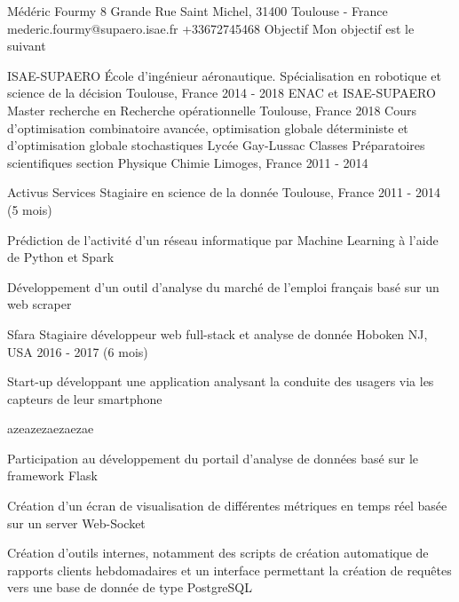 \documentclass[11pt, a4paper, final]{resume}
\begin{document}
	\header
		{Médéric}
		{Fourmy}
		{8 Grande Rue Saint Michel, 31400 Toulouse - France}
		{mederic.fourmy@supaero.isae.fr}
		{+33672745468}
		{Objectif}
		{Mon objectif est le suivant}


	\begin{cventries}
		\cventry
		{ISAE-SUPAERO}
		{École d'ingénieur aéronautique. Spécialisation en robotique et science de la décision}
		{Toulouse, France}
		{2014 - 2018}
		{}
		\cventry
		{ENAC et ISAE-SUPAERO}
		{Master recherche en Recherche opérationnelle}
		{Toulouse, France}
		{2018}
		{Cours d'optimisation combinatoire avancée, optimisation globale déterministe et d'optimisation globale stochastiques}
		\cventry
		{Lycée Gay-Lussac}
		{Classes Préparatoires scientifiques section Physique Chimie}
		{Limoges, France}
		{2011 - 2014}
		{}
	\end{cventries}

	\cvsection{Expérience professionnelle}
	\begin{cventries}
		\cventry
		{Activus Services}
		{Stagiaire en science de la donnée}
		{Toulouse, France}
		{2011 - 2014 (5 mois)}
		{
			\begin{cvitems}{}
				\item Prédiction de l'activité d'un réseau informatique par Machine Learning à l'aide de Python et Spark
				\item Développement d'un outil d'analyse du marché de l'emploi français basé sur un web scraper
			\end{cvitems}
		}
		\cventry
		{Sfara}
		{Stagiaire développeur web full-stack et analyse de donnée}
		{Hoboken NJ, USA}
		{2016 - 2017 (6 mois)}
		{
			Start-up développant une application analysant la conduite des usagers via les capteurs de leur smartphone
			\begin{cvitems}{azeazezaezaezae}
				\item Participation au développement du portail d'analyse de données basé sur le framework Flask
				\item Création d'un écran de visualisation de différentes métriques en temps réel basée sur un server Web-Socket
				\item Création d'outils internes, notamment des scripts de création automatique de rapports clients hebdomadaires et un interface permettant la création de requêtes vers une base de donnée de type PostgreSQL
			\end{cvitems}
		}
	\end{cventries}
\end{document}
